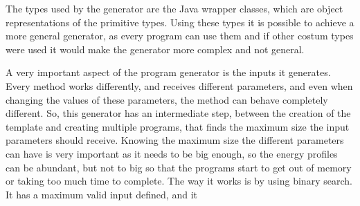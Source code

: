 The types used by the generator are the Java wrapper classes, which are object representations of the primitive types. Using these types it is possible to achieve a more general generator, as every program can use them and if other costum types were used it would make the generator more complex and not general.

A very important aspect of the program generator is the inputs it generates. Every method works differently, and receives different parameters, and even when changing the values of these parameters, the method can behave completely different. So, this generator has an intermediate step, between the creation of the template and creating multiple programs, that finds the maximum size the input parameters should receive. Knowing the maximum size the different parameters can have is very important as it needs to be big enough, so the energy profiles can be abundant, but not to big so that the programs start to get out of memory or taking too much time to complete.
The way it works is by using binary search. It has a maximum valid input defined, and it   

